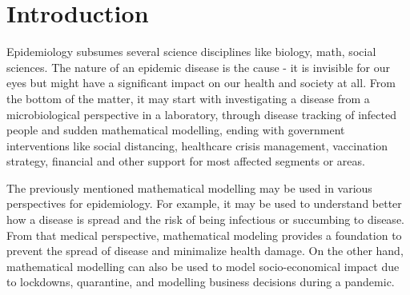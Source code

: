 \documentclass[
  digital, %
  oneside, %
  lof,     %
  lot,     %
]{fithesis4}
\begin{document}

\chapter*{Introduction}

Epidemiology subsumes several science disciplines like biology, math, social sciences.
The nature of an epidemic disease is the cause - it is invisible for our eyes but might have a significant impact on our health and society at all.
From the bottom of the matter, it may start with investigating a disease from a microbiological perspective in a laboratory, through disease tracking of infected people and sudden mathematical modelling, ending with government interventions like social distancing, healthcare crisis management, vaccination strategy, financial and other support for most affected segments or areas.

The previously mentioned mathematical modelling may be used in various perspectives for epidemiology. 
For example, it may be used to understand better how a disease is spread and the risk of being infectious or succumbing to disease.
From that medical perspective, mathematical modeling provides a foundation to prevent the spread of disease and minimalize health damage.
On the other hand, mathematical modelling can also be used to model socio-economical impact due to lockdowns, quarantine, and modelling business decisions during a pandemic.
\end{document}
